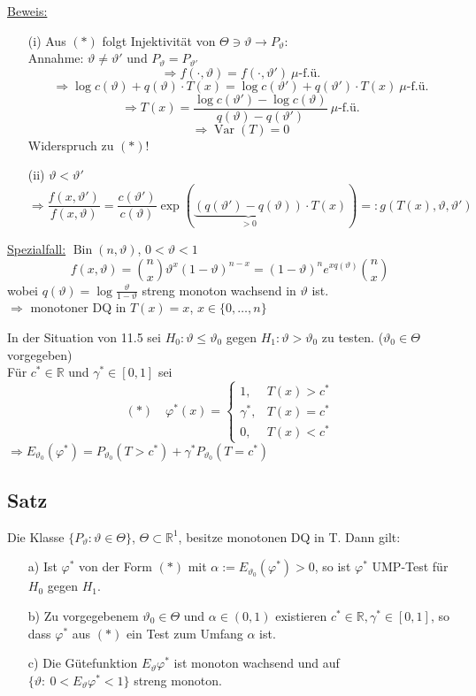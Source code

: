 \documentclass[a4paper,11pt,twoside,titlepage]{article}
\newcommand{\R}{{\mathbb R}}
\DeclareMathOperator{\var}{Var}
\DeclareMathOperator{\Bin}{Bin}
\begin{document}
\underline{Beweis:}
\begin{itemize}
\item[(i)] Aus $(\ast)$ folgt Injektivität von $\Theta\ni\vartheta\to P_\vartheta$:\\
Annahme: $\vartheta\neq\vartheta'$ und $P_\vartheta=P_{\vartheta'}$
\[\Rightarrow f(\cdot,\vartheta)=f(\cdot,\vartheta')\ \mu\mbox{-f.ü.}\]
\[\Rightarrow \log c(\vartheta)+q(\vartheta)\cdot T(x)=\log c(\vartheta')+q(\vartheta')\cdot T(x)\ \mu\mbox{-f.ü.}\]
\[\Rightarrow T(x)=\frac{\log c(\vartheta')-\log c(\vartheta)}{q(\vartheta)-q(\vartheta')}\ \mu\mbox{-f.ü.}\]
\[\Rightarrow \var(T)=0\]
Widerspruch zu $(\ast)$!
\item[(ii)] $\vartheta<\vartheta'$
\[\Rightarrow \frac{f(x,\vartheta')}{f(x,\vartheta)}=\frac{c(\vartheta')}{c(\vartheta)}\exp(\underbrace{(q(\vartheta')-q(\vartheta))}_{>0}\cdot T(x))=:g(T(x),\vartheta,\vartheta')\]
\end{itemize}

\underline{Spezialfall:} $\Bin(n,\vartheta)$, $0<\vartheta<1$
\[f(x,\vartheta)={n\choose x}\vartheta^x(1-\vartheta)^{n-x}=(1-\vartheta)^ne^{xq(\vartheta)}{n\choose x}\]
wobei $q(\vartheta)=\log\frac{\vartheta}{1-\vartheta}$ streng monoton wachsend in $\vartheta$ ist.\\
$\Rightarrow$ monotoner DQ in $T(x)=x$, $x\in\{0,\ldots,n\}$

\vspace{1cm}

In der Situation von 11.5 sei $H_0:\vartheta\leq\vartheta_0$ gegen $H_1:\vartheta>\vartheta_0$ zu testen. ($\vartheta_0\in\Theta$ vorgegeben)\\
Für $c^\ast\in\R$ und $\gamma^\ast\in[0,1]$ sei 
\[(\ast)\quad\varphi^\ast(x)=\left\{\begin{array}{ll}1,&T(x)>c^\ast\\\gamma^\ast,&T(x)=c^\ast\\0,&T(x)<c^\ast\end{array}\right.\]
$\Rightarrow E_{\vartheta_0}(\varphi^\ast)=P_{\vartheta_0}(T>c^\ast)+\gamma^\ast P_{\vartheta_0}(T=c^\ast)$

\subsection{Satz}
Die Klasse $\{P_\vartheta:\vartheta\in\Theta\}$, $\Theta\subset\R^1$, besitze monotonen DQ in T. Dann gilt:
\begin{itemize}
\item[a)] Ist $\varphi^\ast$ von der Form $(\ast)$ mit $\alpha:=E_{\vartheta_0}(\varphi^\ast)>0$, so ist $\varphi^\ast$ UMP-Test für $H_0$ gegen $H_1$.
\item[b)] Zu vorgegebenem $\vartheta_0\in\Theta$ und $\alpha\in(0,1)$ existieren $c^\ast\in\R,\gamma^\ast\in[0,1]$, so dass $\varphi^\ast$ aus $(\ast)$ ein Test zum Umfang $\alpha$ ist.
\item[c)] Die Gütefunktion $E_\vartheta\varphi^\ast$ ist monoton wachsend und auf\\ $\{\vartheta:\ 0<E_\vartheta\varphi^\ast<1\}$ streng monoton.
\end{itemize}
\end{document}
